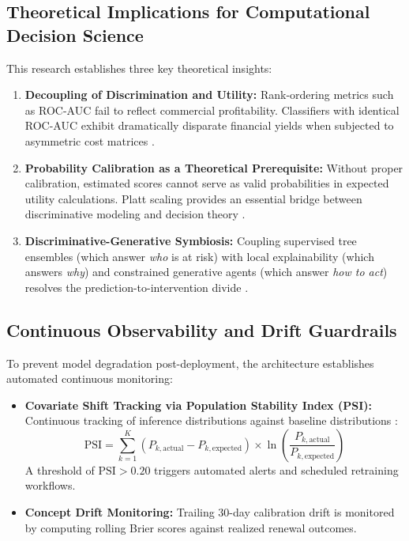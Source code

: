 \documentclass[journal,compsoc]{IEEEtran}
\begin{document}
\subsection{Theoretical Implications for Computational Decision Science}
This research establishes three key theoretical insights:
\begin{enumerate}
    \item \textbf{Decoupling of Discrimination and Utility:} Rank-ordering metrics such as ROC-AUC fail to reflect commercial profitability. Classifiers with identical ROC-AUC exhibit dramatically disparate financial yields when subjected to asymmetric cost matrices \cite{hand2009measuring, verbraeken2012novel}.
    \item \textbf{Probability Calibration as a Theoretical Prerequisite:} Without proper calibration, estimated scores cannot serve as valid probabilities in expected utility calculations. Platt scaling provides an essential bridge between discriminative modeling and decision theory \cite{guo2017calibration, niculescu2005predicting}.
    \item \textbf{Discriminative-Generative Symbiosis:} Coupling supervised tree ensembles (which answer \textit{who} is at risk) with local explainability (which answers \textit{why}) and constrained generative agents (which answer \textit{how to act}) resolves the prediction-to-intervention divide \cite{yao2023react}.
\end{enumerate}

\subsection{Continuous Observability and Drift Guardrails}
To prevent model degradation post-deployment, the architecture establishes automated continuous monitoring:
\begin{itemize}
    \item \textbf{Covariate Shift Tracking via Population Stability Index (PSI):} Continuous tracking of inference distributions against baseline distributions \cite{yurdakul2020statistical}:
    \begin{equation}
    \text{PSI} = \sum_{k=1}^K (P_{k,\text{actual}} - P_{k,\text{expected}}) \times \ln\left(\frac{P_{k,\text{actual}}}{P_{k,\text{expected}}}\right)
    \end{equation}
    A threshold of $\text{PSI} > 0.20$ triggers automated alerts and scheduled retraining workflows.
    \item \textbf{Concept Drift Monitoring:} Trailing 30-day calibration drift is monitored by computing rolling Brier scores against realized renewal outcomes.
\end{itemize}
\end{document}
